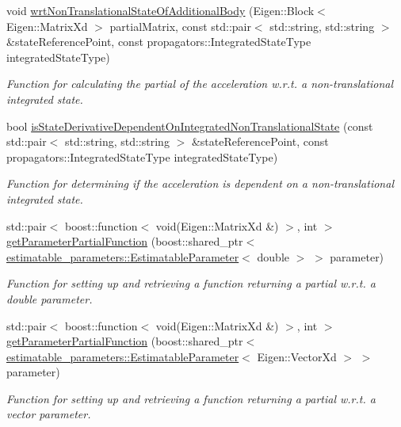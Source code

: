 \begin{DoxyCompactItemize}
void \hyperlink{classtudat_1_1acceleration__partials_1_1ThirdBodyGravityPartial_a904819ad358a8c3d663ad8ea0bfbdb43}{wrt\+Non\+Translational\+State\+Of\+Additional\+Body} (Eigen\+::\+Block$<$ Eigen\+::\+Matrix\+Xd $>$ partial\+Matrix, const std\+::pair$<$ std\+::string, std\+::string $>$ \&state\+Reference\+Point, const propagators\+::\+Integrated\+State\+Type integrated\+State\+Type)
\begin{DoxyCompactList}\small\item\em Function for calculating the partial of the acceleration w.\+r.\+t. a non-\/translational integrated state. \end{DoxyCompactList}\item 
bool \hyperlink{classtudat_1_1acceleration__partials_1_1ThirdBodyGravityPartial_a67018048ca499005a043b56db02e151e}{is\+State\+Derivative\+Dependent\+On\+Integrated\+Non\+Translational\+State} (const std\+::pair$<$ std\+::string, std\+::string $>$ \&state\+Reference\+Point, const propagators\+::\+Integrated\+State\+Type integrated\+State\+Type)
\begin{DoxyCompactList}\small\item\em Function for determining if the acceleration is dependent on a non-\/translational integrated state. \end{DoxyCompactList}\item 
std\+::pair$<$ boost\+::function$<$ void(Eigen\+::\+Matrix\+Xd \&) $>$, int $>$ \hyperlink{classtudat_1_1acceleration__partials_1_1ThirdBodyGravityPartial_aeef24c0471c57b34f1ae7f235f1920d8}{get\+Parameter\+Partial\+Function} (boost\+::shared\+\_\+ptr$<$ \hyperlink{classtudat_1_1estimatable__parameters_1_1EstimatableParameter}{estimatable\+\_\+parameters\+::\+Estimatable\+Parameter}$<$ double $>$ $>$ parameter)
\begin{DoxyCompactList}\small\item\em Function for setting up and retrieving a function returning a partial w.\+r.\+t. a double parameter. \end{DoxyCompactList}\item 
std\+::pair$<$ boost\+::function$<$ void(Eigen\+::\+Matrix\+Xd \&) $>$, int $>$ \hyperlink{classtudat_1_1acceleration__partials_1_1ThirdBodyGravityPartial_ac3487afc5a8fd57e4af4c55da1417bca}{get\+Parameter\+Partial\+Function} (boost\+::shared\+\_\+ptr$<$ \hyperlink{classtudat_1_1estimatable__parameters_1_1EstimatableParameter}{estimatable\+\_\+parameters\+::\+Estimatable\+Parameter}$<$ Eigen\+::\+Vector\+Xd $>$ $>$ parameter)
\begin{DoxyCompactList}\small\item\em Function for setting up and retrieving a function returning a partial w.\+r.\+t. a vector parameter. \end{DoxyCompactList}\item 

\end{DoxyCompactItemize}
